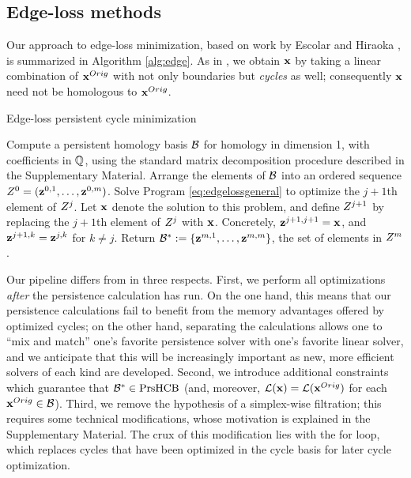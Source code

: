 \subsection{Edge-loss methods}
\label{sec:edgelossmethods}

 
Our approach to edge-loss minimization, based on work by Escolar and Hiraoka \cite{Escolar2016}, is summarized in Algorithm \ref{alg:edge}.  As in \cite{Escolar2016}, we obtain $\mathbf{x}$  by taking a linear combination of $\mathbf{x}^{Orig}$ with not only boundaries but \emph{cycles} as well; consequently $\mathbf{x}$ need not be homologous to $\mathbf{x}^{Orig}$.  
\begin{algorithm}
\caption{Edge-loss persistent cycle minimization}
\label{alg:edge}
\begin{algorithmic}[1]
\STATE Compute a persistent homology basis $\mathcal B$ for homology in dimension 1, with coefficients in $\mathbb{Q}$,  using the standard matrix decomposition procedure described in the Supplementary Material. Arrange the elements of $\mathcal B$ into an ordered sequence $Z^0 = (\mathbf{z}^{0,1}, \ldots, \mathbf{z}^{0,m})$.
\STATE Solve Program \eqref{eq:edgelossgeneral} to optimize the $j+1$th element of $Z^{j}$.  Let $\mathbf{x}$ denote the solution to this problem, and define $Z^{j+1}$ by replacing the $j+1$th element of $Z^{j}$ with $\mathbf{x}$.  Concretely, $\mathbf{z}^{j+1,j+1} = \mathbf{x}$, and $\mathbf{z}^{j+1,k} = \mathbf{z}^{j,k}$ for $k \neq j$.
\ENDFOR
\STATE Return $\mathcal B^*: = \{\mathbf{z}^{m,1}, \ldots, \mathbf{z}^{m,m}\}$, the set of elements in $Z^m$.
\end{algorithmic}
\end{algorithm}

Our pipeline differs from \cite{Escolar2016} in three respects.  First, we perform all optimizations \emph{after} the persistence calculation has run.   On the one hand, this means that our persistence calculations  fail to  benefit from the memory advantages offered by optimized cycles; on the other hand, separating the calculations allows one to ``mix and match'' one's favorite persistence solver with one's favorite linear solver, and we anticipate that this will be increasingly important as new, more efficient solvers of each kind are developed.  Second, we introduce additional constraints which guarantee that $\mathcal B^* \in \mathrm{PrsHCB}$  
(and, moreover, $\mathcal{L}( \mathbf{x}) = \mathcal{L}( \mathbf{x}^{Orig})$ for each $\mathbf{x}^{Orig} \in \mathcal B$). Third, we remove the hypothesis of a simplex-wise filtration; this requires some technical modifications, whose motivation is explained in the Supplementary Material. The crux of this modification lies with the for loop, which replaces cycles that have been optimized in the cycle basis for later cycle optimization.

